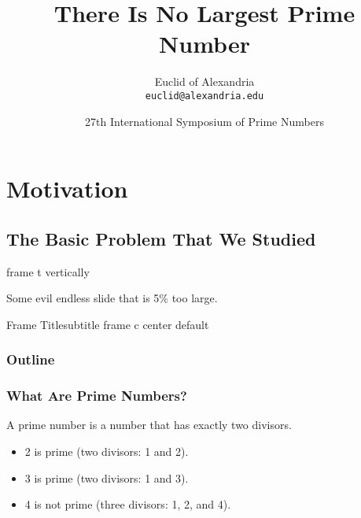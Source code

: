 \documentclass{beamer}
\title{There Is No Largest Prime Number}
\author[Euclid]{Euclid of Alexandria \\ \texttt{euclid@alexandria.edu}}
\date[ISPN ’80]{27th International Symposium of Prime Numbers}
\begin{document}
\section{Motivation}
\subsection{The Basic Problem That We Studied}

\begin{frame}
  \titlepage
\end{frame}

\begin{frame}[t]
  frame t vertically
\end{frame}

\begin{frame}[plain]
  \begin{centering}%
  \end{centering}%
\end{frame}

\begin{frame}[shrink=5] %
Some evil endless slide that is 5\% too large.
\end{frame}

\begin{frame}{Frame Title}{subtitle}
  frame c center default
\end{frame}

\begin{frame}
  \frametitle{Outline}
  \tableofcontents[pausesections]
\end{frame}

\begin{frame}
  \frametitle{What Are Prime Numbers?}
  \begin{definition}
    A \alert{prime number} is a number that has exactly two divisors.
  \end{definition}
  \begin{example}
    \begin{itemize}
    \item 2 is prime (two divisors: 1 and 2).
      \pause
    \item 3 is prime (two divisors: 1 and 3).
      \pause
    \item 4 is not prime (\alert{three} divisors: 1, 2, and 4).
    \end{itemize}
  \end{example}
\end{frame}
\end{document}

